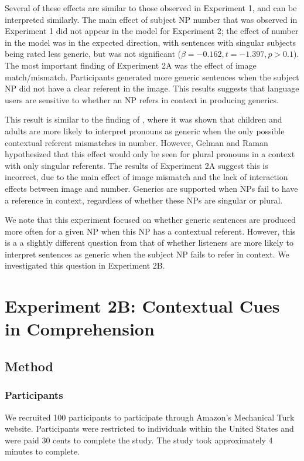 \documentclass[10pt,letterpaper]{article}
\begin{document}
Several of these effects are similar to those observed in Experiment 1, and can be interpreted similarly. The main effect of subject NP number that was observed in Experiment 1 did not appear in the model for Experiment 2; the effect of number in the model was in the expected direction, with sentences with singular subjects being rated less generic, but was not significant (\(\beta = -0.162, t = -1.397, p > 0.1\)). The most important finding of Experiment 2A was the effect of image match/mismatch. Participants generated more generic sentences when the subject NP did not have a clear referent in the image. This results suggests that language users are sensitive to whether an NP refers in context in producing generics.

This result is similar to the finding of , where it was shown that children and adults are more likely to interpret pronouns as generic when the only possible contextual referent mismatches in number. However, Gelman and Raman hypothesized that this effect would only be seen for plural pronouns in a context with only singular referents. The results of Experiment 2A suggest this is incorrect, due to the main effect of image mismatch and the lack of interaction effects between image and number. Generics are supported when NPs fail to have a reference in context, regardless of whether these NPs are singular or plural.

We note that this experiment focused on whether generic sentences are produced more often for a given NP when this NP has a contextual referent. However, this is a a slightly different question from that of whether listeners are more likely to interpret sentences as generic when the subject NP fails to refer in context. We investigated this question in Experiment 2B. 

\section{Experiment 2B: Contextual Cues in Comprehension}

\subsection{Method}

\subsubsection{Participants} \quad We recruited 100 participants to participate through Amazon's Mechanical Turk website. Participants were restricted to individuals within the United States and were paid 30 cents to complete the study. The study took approximately 4 minutes to complete.
\end{document}
